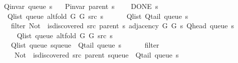 \begin{isabellebody}
\ \ \ {\isachardoublequoteopen}Q{\isacharunderscore}{\kern0pt}invar\ {\isacharparenleft}{\kern0pt}queue\ s{\isacharparenright}{\kern0pt}{\isachardoublequoteclose}\isanewline
\ \ \ {\isachardoublequoteopen}P{\isacharunderscore}{\kern0pt}invar\ {\isacharparenleft}{\kern0pt}parent\ s{\isacharparenright}{\kern0pt}{\isachardoublequoteclose}\isanewline
\ \ \ {\isachardoublequoteopen}{\isasymnot}\ DONE\ s{\isachardoublequoteclose}\isanewline
\ \ \isanewline
\ \ \ \ {\isachardoublequoteopen}Q{\isacharunderscore}{\kern0pt}list\ {\isacharparenleft}{\kern0pt}queue\ {\isacharparenleft}{\kern0pt}alt{\isacharunderscore}{\kern0pt}fold\ G{}\ G{}\ src\ s{\isacharparenright}{\kern0pt}{\isacharparenright}{\kern0pt}\ {\isacharequal}{\kern0pt}\isanewline
\ \ \ \ \ Q{\isacharunderscore}{\kern0pt}list\ {\isacharparenleft}{\kern0pt}Q{\isacharunderscore}{\kern0pt}tail\ {\isacharparenleft}{\kern0pt}queue\ s{\isacharparenright}{\kern0pt}{\isacharparenright}{\kern0pt}\ {\isacharat}{\kern0pt}\isanewline
\ \ \ \ \ filter\ {\isacharparenleft}{\kern0pt}Not\ {\isasymcirc}\ is{\isacharunderscore}{\kern0pt}discovered\ src\ {\isacharparenleft}{\kern0pt}parent\ s{\isacharparenright}{\kern0pt}{\isacharparenright}{\kern0pt}\ {\isacharparenleft}{\kern0pt}adjacency\ G{}\ G{}\ s\ {\isacharparenleft}{\kern0pt}Q{\isacharunderscore}{\kern0pt}head\ {\isacharparenleft}{\kern0pt}queue\ s{\isacharparenright}{\kern0pt}{\isacharparenright}{\kern0pt}{\isacharparenright}{\kern0pt}{\isachardoublequoteclose}\isanewline
%
\isadelimproof
%
\endisadelimproof
%
\isatagproof
{}\isamarkupfalse%
\ {\isacharminus}{\kern0pt}\isanewline
\ \ \isamarkupfalse%
\isanewline
\ \ \ \ {\isachardoublequoteopen}Q{\isacharunderscore}{\kern0pt}list\ {\isacharparenleft}{\kern0pt}queue\ {\isacharparenleft}{\kern0pt}alt{\isacharunderscore}{\kern0pt}fold\ G{}\ G{}\ src\ s{\isacharparenright}{\kern0pt}{\isacharparenright}{\kern0pt}\ {\isacharequal}{\kern0pt}\isanewline
\ \ \ \ \ Q{\isacharunderscore}{\kern0pt}list\ {\isacharparenleft}{\kern0pt}queue\ {\isacharparenleft}{\kern0pt}s{\isasymlparr}queue\ {\isacharcolon}{\kern0pt}{\isacharequal}{\kern0pt}\ Q{\isacharunderscore}{\kern0pt}tail\ {\isacharparenleft}{\kern0pt}queue\ s{\isacharparenright}{\kern0pt}{\isasymrparr}{\isacharparenright}{\kern0pt}{\isacharparenright}{\kern0pt}\ {\isacharat}{\kern0pt}\isanewline
\ \ \ \ \ filter\isanewline
\ \ \ \ \ \ {\isacharparenleft}{\kern0pt}Not\ {\isasymcirc}\ is{\isacharunderscore}{\kern0pt}discovered\ src\ {\isacharparenleft}{\kern0pt}parent\ {\isacharparenleft}{\kern0pt}s{\isasymlparr}queue\ {\isacharcolon}{\kern0pt}{\isacharequal}{\kern0pt}\ Q{\isacharunderscore}{\kern0pt}tail\ {\isacharparenleft}{\kern0pt}queue\ s{\isacharparenright}{\kern0pt}{\isasymrparr}{\isacharparenright}{\kern0pt}{\isacharparenright}{\kern0pt}{\isacharparenright}{\kern0pt}\isanewline

\end{isabellebody}
